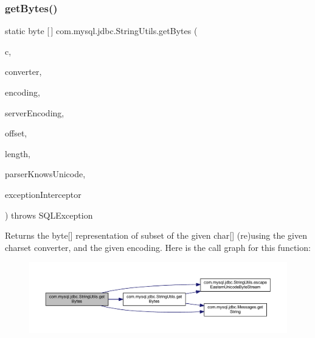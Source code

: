\subsubsection{\texorpdfstring{get\+Bytes()}{getBytes()}\hspace{0.1cm}{\footnotesize\ttfamily [2/7]}}
{\footnotesize\ttfamily static byte \mbox{[}$\,$\mbox{]} com.\+mysql.\+jdbc.\+String\+Utils.\+get\+Bytes (\begin{DoxyParamCaption}\item[{char \mbox{[}$\,$\mbox{]}}]{c,  }\item[{\mbox{\hyperlink{classcom_1_1mysql_1_1jdbc_1_1_single_byte_charset_converter}{Single\+Byte\+Charset\+Converter}}}]{converter,  }\item[{String}]{encoding,  }\item[{String}]{server\+Encoding,  }\item[{int}]{offset,  }\item[{int}]{length,  }\item[{boolean}]{parser\+Knows\+Unicode,  }\item[{\mbox{\hyperlink{interfacecom_1_1mysql_1_1jdbc_1_1_exception_interceptor}{Exception\+Interceptor}}}]{exception\+Interceptor }\end{DoxyParamCaption}) throws S\+Q\+L\+Exception\hspace{0.3cm}{\ttfamily [static]}}

Returns the byte\mbox{[}\mbox{]} representation of subset of the given char\mbox{[}\mbox{]} (re)using the given charset converter, and the given encoding. Here is the call graph for this function\+:
\nopagebreak
\begin{figure}[H]
\begin{center}
\leavevmode
\includegraphics[width=350pt]{classcom_1_1mysql_1_1jdbc_1_1_string_utils_afa77878bbb64c7649486eab195b72185_cgraph}
\end{center}
\end{figure}
\mbox{\label{classcom_1_1mysql_1_1jdbc_1_1_string_utils_a4997696bd5f691e1bdfe5b41dec49be1}} 

